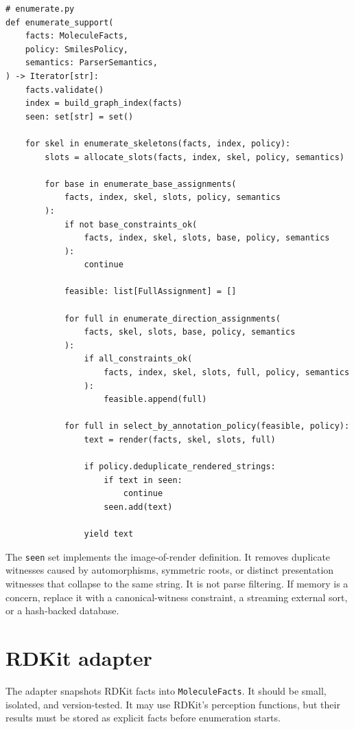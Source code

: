 \documentclass[10pt,a4paper]{article}
\theoremstyle{definition}
\theoremstyle{remark}
\begin{document}
\begin{lstlisting}
# enumerate.py
def enumerate_support(
    facts: MoleculeFacts,
    policy: SmilesPolicy,
    semantics: ParserSemantics,
) -> Iterator[str]:
    facts.validate()
    index = build_graph_index(facts)
    seen: set[str] = set()

    for skel in enumerate_skeletons(facts, index, policy):
        slots = allocate_slots(facts, index, skel, policy, semantics)

        for base in enumerate_base_assignments(
            facts, index, skel, slots, policy, semantics
        ):
            if not base_constraints_ok(
                facts, index, skel, slots, base, policy, semantics
            ):
                continue

            feasible: list[FullAssignment] = []

            for full in enumerate_direction_assignments(
                facts, skel, slots, base, policy, semantics
            ):
                if all_constraints_ok(
                    facts, index, skel, slots, full, policy, semantics
                ):
                    feasible.append(full)

            for full in select_by_annotation_policy(feasible, policy):
                text = render(facts, skel, slots, full)

                if policy.deduplicate_rendered_strings:
                    if text in seen:
                        continue
                    seen.add(text)

                yield text
\end{lstlisting}

The \texttt{seen} set implements the image-of-render definition.  It removes
duplicate witnesses caused by automorphisms, symmetric roots, or distinct
presentation witnesses that collapse to the same string.  It is not parse
filtering.  If memory is a concern, replace it with a canonical-witness
constraint, a streaming external sort, or a hash-backed database.

\section{RDKit adapter}
\label{s:adapter}

The adapter snapshots RDKit facts into \texttt{MoleculeFacts}.  It should be
small, isolated, and version-tested.  It may use RDKit's perception functions,
but their results must be stored as explicit facts before enumeration starts.
\end{document}
